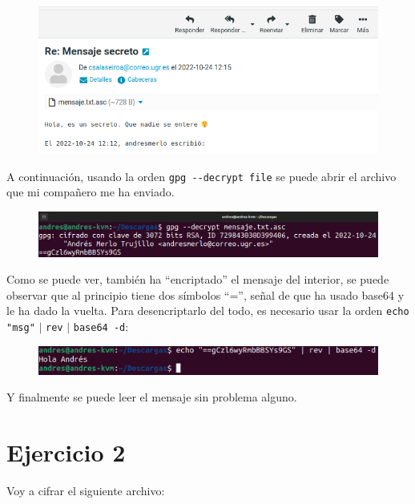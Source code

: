 \documentclass{article}
\begin{document}
\begin{figure}[H]
    \includegraphics[width=\textwidth]{imagenes/Portatil/Captura desde 2022-10-24 12-16-48.png}
\end{figure}

A continuación, usando la orden \verb|gpg --decrypt file| se puede abrir el archivo que mi compañero me ha enviado.

\begin{figure}[H]
    \includegraphics[width=\textwidth]{imagenes/Portatil/Captura desde 2022-10-24 12-18-40.png}
\end{figure}

Como se puede ver, también ha ``encriptado'' el mensaje del interior, se puede observar que al principio tiene dos símbolos ``='', señal de que ha usado base64 y le ha dado la vuelta. Para desencriptarlo del todo, es necesario usar la orden \verb|echo "msg"| $\vert$ \verb|rev| $\vert$ \verb|base64 -d|:

\begin{figure}[H]
    \includegraphics[width=\textwidth]{imagenes/Portatil/base64.png}
\end{figure}

Y finalmente se puede leer el mensaje sin problema alguno.

\section*{Ejercicio 2}

Voy a cifrar el siguiente archivo:
\end{document}
